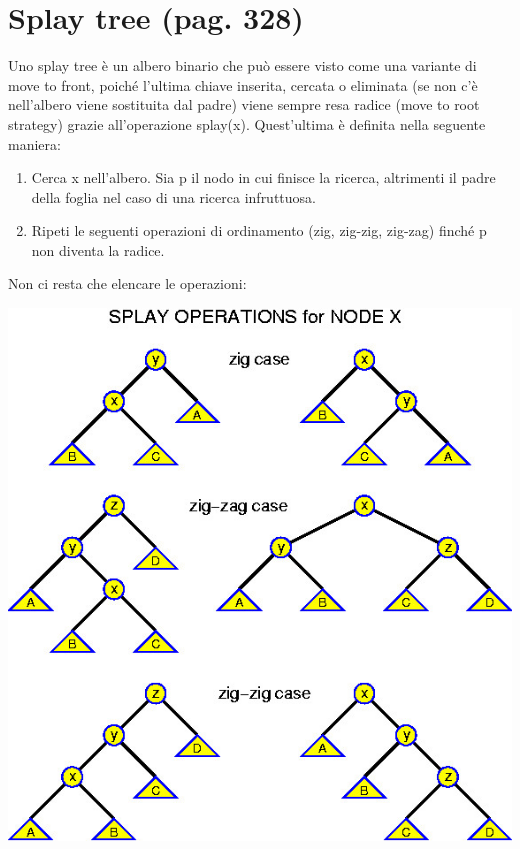 \documentclass[a4paper]{book}
\begin{document}
\section{Splay tree (pag. 328)}
Uno splay tree è un albero binario che può essere visto come una variante di move to front, poiché l'ultima chiave inserita, cercata o eliminata (se non c'è nell'albero viene sostituita dal padre) viene sempre resa radice (move to root strategy) grazie all'operazione splay(x). Quest'ultima è definita nella seguente maniera:
\begin{enumerate}
\item Cerca x nell'albero. Sia p il nodo in cui finisce la ricerca, altrimenti il padre della foglia nel caso di una ricerca infruttuosa.
\item Ripeti le seguenti operazioni di ordinamento (zig, zig-zig, zig-zag) finché p non diventa la radice.
\end{enumerate}
Non ci resta che elencare le operazioni:
\begin{center}
\includegraphics[scale=0.5]{Figures/splay.jpg}
\end{center}
\end{document}
